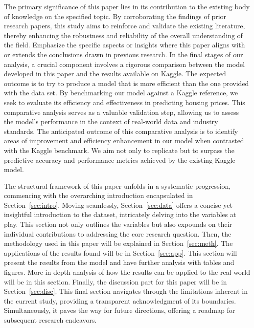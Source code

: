 \documentclass[12pt]{article}
\begin{document}
The primary significance of this paper lies in its contribution to the existing body of knowledge on the specified topic. By corroborating the findings of prior research papers, this study aims to reinforce and validate the existing literature, thereby enhancing the robustness and reliability of the overall understanding of the field. Emphasize the specific aspects or insights where this paper aligns with or extends the conclusions drawn in previous research. In the final stages of our analysis, a crucial component involves a rigorous comparison between the model developed in this paper and the results available on \href{https://www.kaggle.com/code/ashydv/housing-price-prediction-linear-regression/notebook}{Kaggle}. The expected outcome is to try to produce a model that is more efficient than the one provided with the data set. By benchmarking our model against a Kaggle reference, we seek to evaluate its efficiency and effectiveness in predicting housing prices. This comparative analysis serves as a valuable validation step, allowing us to assess the model's performance in the context of real-world data and industry standards. The anticipated outcome of this comparative analysis is to identify areas of improvement and efficiency enhancement in our model when contrasted with the Kaggle benchmark. We aim not only to replicate but to surpass the predictive accuracy and performance metrics achieved by the existing Kaggle model. 

The structural framework of this paper unfolds in a systematic progression, commencing with the overarching introduction encapsulated in Section~\ref{sec:intro}. Moving seamlessly, Section~\ref{sec:data} offers a concise yet insightful introduction to the dataset, intricately delving into the variables at play. This section not only outlines the variables but also expounds on their individual contributions to addressing the core research question. Then, the methodology used in this paper will be explained in Section~\ref{sec:meth}. The applications of the results found will be in Section~\ref{sec:app}. This section will present the results from the model and have further analysis with tables and figures. More in-depth analysis of how the results can be applied to the real world will be in this section. Finally, the discussion part for this paper will be in Section~\ref{sec:disc}. This final section navigates through the limitations inherent in the current study, providing a transparent acknowledgment of its boundaries. Simultaneously, it paves the way for future directions, offering a roadmap for subsequent research endeavors. 
\end{document}
